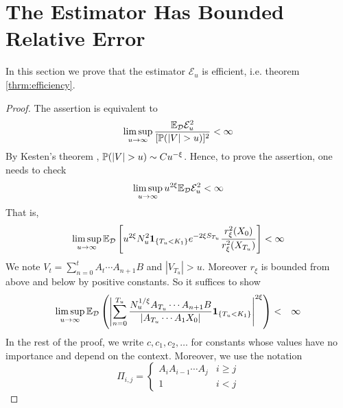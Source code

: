 \documentclass[aoas,preprint]{imsart}
\numberwithin{equation}{section}
\theoremstyle{plain}
\begin{document}
\section{The Estimator Has Bounded Relative
  Error}\label{sec:efficiency}
In this section we prove that the estimator $\mathcal E_u$ is
efficient, i.e. theorem \ref{thrm:efficiency}.
\begin{proof}\setcounter{case}{0}
  The assertion is equivalent to
  \[
  \limsup_{u \to \infty} {\E_{\mathcal D} \mathcal E_u^2 \over [\P(|V|
    > u)]^2} < \infty
  \]
  By Kesten's theorem \cite{kesten:1973},
  $\P(|V| > u) \sim C u^{-\xi}$.
  Hence, to prove the assertion, one needs to check
  \[
  \limsup_{u \to \infty} u^{2\xi}\E_{\mathcal D} \mathcal E_u^2
  <
  \infty
  \]
That is,
  \[
  \limsup_{u \to \infty} \E_{\mathcal D}
  \left[
    u^{2\xi}
    N_u^2 \1{T_u < K_1} e^{-2\xi S_{T_u}} {r_\xi^2(X_0)
      \over r_\xi^2(X_{T_u})}
  \right] < \infty
  \]
  We note $V_t = \sum_{n=0}^t A_{t} \cdots A_{n+1} B$ and
  $|V_{T_u}| > u$. Moreover $r_\xi$ is bounded
  from above and below by positive constants. So it suffices to show
  \begin{eqnarray}
    \limsup_{u \to \infty} \E_{\mathcal D} \left(
      \left|
        \sum_{n=0}^{T_u}
        \frac{
          N_u^{1/\xi} A_{T_u} \cdots A_{n+1} B 
        }{
          |A_{T_u} \cdots A_1 X_0|
        }
        \1{T_u < K_1}
      \right|^{2 \xi}
    \right) &<& \infty \label{eq:efficiency_target}
  \end{eqnarray}
  In the rest of the proof, we write $c, c_1, c_2, \dots$ for
  constants whose values have no importance and depend on the
  context. Moreover, we use the notation
  \[
  \Pi_{i,j} = \left\{
    \begin{array}{ll}
      A_i A_{i-1} \cdots A_j & i \geq j \\
      1 & i < j
    \end{array}
  \right.
  \]


\end{proof}
\end{document}
